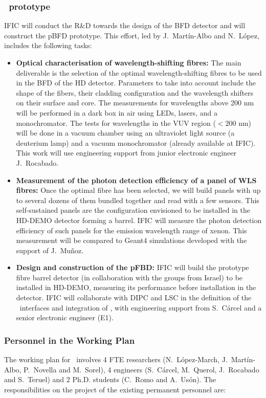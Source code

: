 \subsubsection*{\HDEMO\ prototype}


IFIC will conduct the R\&D towards the design of the BFD detector and will construct the pBFD prototype. This effort, led by J.~Mart\'in-Albo and N.~L\'opez, includes the following  tasks:
\begin{itemize}[noitemsep,topsep=0pt,parsep=0pt,partopsep=0pt]
    \item \textbf{Optical characterisation of wavelength-shifting fibres:} The main deliverable is the selection of the optimal wavelength-shifting fibres to be used in the BFD of the HD detector. Parameters to take into account include the shape of the fibers, their cladding configuration and the wavelength shifters on their surface and core. The measurements for wavelengths above 200 nm will be performed in a dark box in air using LEDs, lasers, and  a monochromator. The tests for wavelengths in the VUV region ($<200$ nm) will be done in a vacuum chamber using an ultraviolet light source (a deuterium lamp) and a vacuum monochromator (already available at IFIC). This work will use engineering support from junior electronic engineer J.~Rocabado. 
    \item \textbf{Measurement of the photon detection efficiency of a panel of WLS fibres:} Once the optimal fibre has been selected, we will build panels with up to several dozens of them bundled together and read with a few sensors. This self-sustained panels are the configuration envisioned to be installed in the HD-DEMO detector forming a barrel. IFIC will measure the photon detection efficiency of such panels for the emission wavelength range of xenon. This measurement will be compared to Geant4 simulations developed with the support of J.~Muñoz.
    \item \textbf{Design and construction of the pFBD:} IFIC will build the prototype fibre barrel detector (in collaboration with the groups from Israel) to be installed in HD-DEMO, measuring its performance before installation in the detector. IFIC will collaborate with DIPC and LSC in the definition of the \NHD\ interfaces and integration of \NHD, with engineering support from S.~Cárcel and a senior electronic engineer (E1).
\end{itemize}
 

\subsubsection*{Personnel in the Working Plan}
The working plan for \sIFIC\ involves 4 FTE researchers (N.~L\'opez-March, J.~Mart\'in-Albo, P.~Novella and M.~Sorel), 4 engineers (S.~C\'arcel, M.~Querol, J.~Rocabado and S.~Teruel) and 2 Ph.D. students (C.~Romo and A.~Us\'on). The responsibilities on the project of the existing permanent personnel are:


